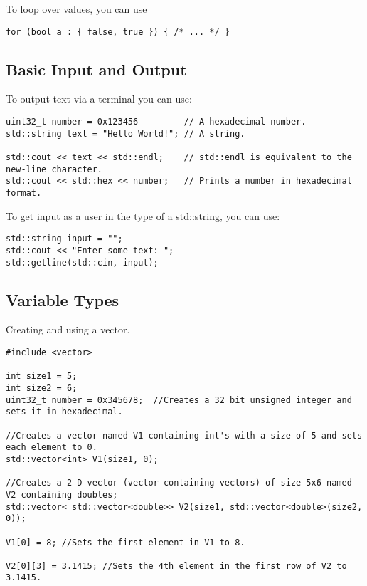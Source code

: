To loop over  values, you can use
\begin{lstlisting}
for (bool a : { false, true }) { /* ... */ }
\end{lstlisting}








\subsection{Basic Input and Output}
To output text via a terminal you can use:
\begin{lstlisting}
uint32_t number = 0x123456         // A hexadecimal number.
std::string text = "Hello World!"; // A string.

std::cout << text << std::endl;    // std::endl is equivalent to the new-line character.
std::cout << std::hex << number;   // Prints a number in hexadecimal format.
\end{lstlisting}

To get input as a user in the type of a std::string, you can use:
\begin{lstlisting}
std::string input = "";
std::cout << "Enter some text: ";
std::getline(std::cin, input);
\end{lstlisting}











\subsection{Variable Types}

Creating and using a vector.
\begin{lstlisting}
#include <vector>

int size1 = 5;
int size2 = 6;
uint32_t number = 0x345678;  //Creates a 32 bit unsigned integer and sets it in hexadecimal.

//Creates a vector named V1 containing int's with a size of 5 and sets each element to 0. 
std::vector<int> V1(size1, 0); 

//Creates a 2-D vector (vector containing vectors) of size 5x6 named V2 containing doubles;
std::vector< std::vector<double>> V2(size1, std::vector<double>(size2, 0)); 

V1[0] = 8; //Sets the first element in V1 to 8.

V2[0][3] = 3.1415; //Sets the 4th element in the first row of V2 to 3.1415.
\end{lstlisting}







